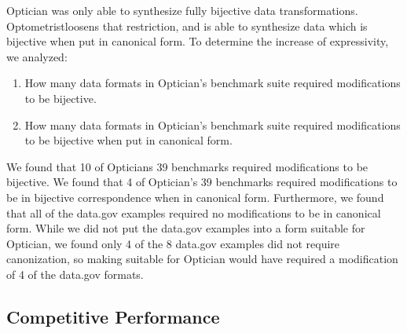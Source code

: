 \documentclass{svproc}
\newcommand{\Name}{Optometrist}
\begin{document}
Optician was only able to synthesize fully bijective data transformations.
\Name loosens that restriction, and is able to synthesize data which is
bijective when put in canonical form.
To determine the increase of expressivity, we analyzed:
\begin{enumerate}
\item How many data formats in Optician's benchmark suite required modifications
  to be bijective.
\item How many data formats in Optician's benchmark suite required modifications
  to be bijective when put in canonical form.
\end{enumerate}

We found that 10 of Opticians 39 benchmarks required modifications to be
bijective. We found that 4 of Optician's 39
benchmarks required modifications to be in bijective correspondence when in
canonical form.  Furthermore, we found that all of the data.gov examples
required no modifications to be in canonical form.  While we did not put the
data.gov examples into a form suitable for Optician, we found only 4 of
the 8 data.gov examples did not require canonization, so making suitable
for Optician would have required a modification of 4 of the data.gov
formats.

\subsection{Competitive Performance}
\end{document}
